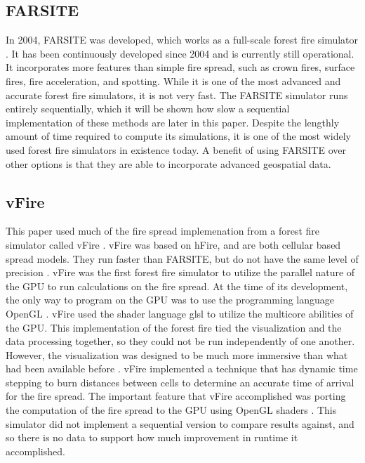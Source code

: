 \subsection{FARSITE}
In 2004, FARSITE was developed, which works as a full-scale forest fire simulator \cite{FARSITE}. It has been continuously developed since 2004 and is currently still operational. It incorporates more features than simple fire spread, such as crown fires, surface fires, fire acceleration, and spotting. While it is one of the most advanced and accurate forest fire simulators, it is not very fast. The FARSITE simulator runs entirely sequentially, which it will be shown how slow a sequential implementation of these methods are later in this paper. Despite the lengthly amount of time required to compute its simulations, it is one of the most widely used forest fire simulators in existence today. A benefit of using FARSITE over other options is that they are able to incorporate advanced geospatial data.

\subsection{vFire}
This paper used much of the fire spread implemenation from a forest fire simulator called vFire \cite{vFire, rogerthesis, rogerconf}. vFire was based on hFire, and are both cellular based spread models. They run faster than FARSITE, but do not have the same level of precision \cite{hFire}. vFire was the first forest fire simulator to utilize the parallel nature of the GPU to run calculations on the fire spread. At the time of its development, the only way to program on the GPU was to use the programming language OpenGL \cite{opengl}. vFire used the shader language glsl to utilize the multicore abilities of the GPU. This implementation of the forest fire tied the visualization and the data processing together, so they could not be run independently of one another. However, the visualization was designed to be much more immersive than what had been available before \cite{rogerconf_data}. vFire implemented a technique that has dynamic time stepping to burn distances between cells to determine an accurate time of arrival for the fire spread. The important feature that vFire accomplished was porting the computation of the fire spread to the GPU using OpenGL shaders \cite{opengl}. This simulator did not implement a sequential version to compare results against, and so there is no data to support how much improvement in runtime it accomplished. 


